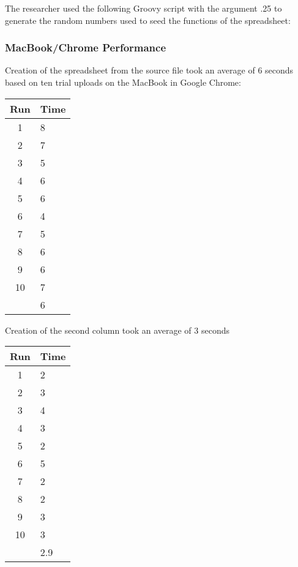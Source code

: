 \documentclass[12pt,oneside,letterpaper,titlepage]{article}
\begin{document}
The researcher used the following Groovy script with the argument .25 to
generate the random numbers used to seed the functions of the spreadsheet:



\subsubsection{MacBook/Chrome Performance}

Creation of the spreadsheet from the source file took an average of 6 seconds
based on ten trial uploads on the MacBook in Google Chrome:

\begin{tabular}{| c | l |}
  \hline
  Run  & Time \\ \hline
  1    & 8    \\ \hline
  2    & 7    \\ \hline
  3    & 5    \\ \hline
  4    & 6    \\ \hline
  5    & 6    \\ \hline
  6    & 4    \\ \hline
  7    & 5    \\ \hline
  8    & 6    \\ \hline
  9    & 6    \\ \hline
  10   & 7    \\ \hline
       & 6    \\
  \hline
\end{tabular}

Creation of the second column took an average of 3 seconds

\begin{tabular}{| c | l |}
  \hline
  Run  & Time \\ \hline
  1    & 2    \\ \hline
  2    & 3    \\ \hline
  3    & 4    \\ \hline
  4    & 3    \\ \hline
  5    & 2    \\ \hline
  6    & 5    \\ \hline
  7    & 2    \\ \hline
  8    & 2    \\ \hline
  9    & 3    \\ \hline
  10   & 3    \\ \hline
       & 2.9  \\
  \hline
\end{tabular}
\end{document}
